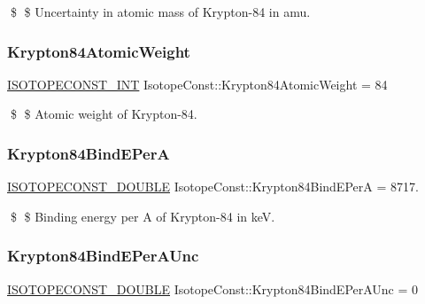 \$ \$ Uncertainty in atomic mass of Krypton-\/84 in amu. \mbox{\label{group___isotope_const-_krypton-_kr84_ga2384dc9739a8cb9fe9f020bed2218dc6}} 
\subsubsection{\texorpdfstring{Krypton84\+Atomic\+Weight}{Krypton84AtomicWeight}}
{\footnotesize\ttfamily \mbox{\hyperlink{group___isotope_const-_macros_ga5f18360b3e99483a35c32d789e62621c}{I\+S\+O\+T\+O\+P\+E\+C\+O\+N\+S\+T\+\_\+\+I\+NT}} Isotope\+Const\+::\+Krypton84\+Atomic\+Weight = 84}

\$ \$ Atomic weight of Krypton-\/84. \mbox{\label{group___isotope_const-_krypton-_kr84_ga32972f8c5454728879542d18b1621787}} 
\subsubsection{\texorpdfstring{Krypton84\+Bind\+E\+PerA}{Krypton84BindEPerA}}
{\footnotesize\ttfamily \mbox{\hyperlink{group___isotope_const-_macros_ga8f45a7272ce02c0b4c65c44636ed719a}{I\+S\+O\+T\+O\+P\+E\+C\+O\+N\+S\+T\+\_\+\+D\+O\+U\+B\+LE}} Isotope\+Const\+::\+Krypton84\+Bind\+E\+PerA = 8717.}

\$ \$ Binding energy per A of Krypton-\/84 in keV. \mbox{\label{group___isotope_const-_krypton-_kr84_ga99dee1b31dba8cb4bf0341312f020cd8}} 
\subsubsection{\texorpdfstring{Krypton84\+Bind\+E\+Per\+A\+Unc}{Krypton84BindEPerAUnc}}
{\footnotesize\ttfamily \mbox{\hyperlink{group___isotope_const-_macros_ga8f45a7272ce02c0b4c65c44636ed719a}{I\+S\+O\+T\+O\+P\+E\+C\+O\+N\+S\+T\+\_\+\+D\+O\+U\+B\+LE}} Isotope\+Const\+::\+Krypton84\+Bind\+E\+Per\+A\+Unc = 0}

